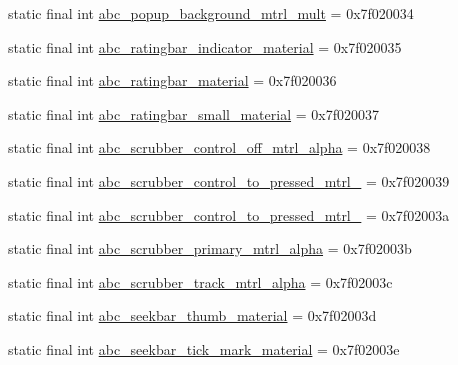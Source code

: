 \begin{CompactItemize}
\item 
static final int \hyperlink{classandroid_1_1support_1_1graphics_1_1drawable_1_1animated_1_1_r_1_1drawable_2c3cd96e28bd579a1da0616b4659d34b}{abc\_\-popup\_\-background\_\-mtrl\_\-mult} = 0x7f020034
\item 
static final int \hyperlink{classandroid_1_1support_1_1graphics_1_1drawable_1_1animated_1_1_r_1_1drawable_248b5dc39a5e104691fc50765a13eaaf}{abc\_\-ratingbar\_\-indicator\_\-material} = 0x7f020035
\item 
static final int \hyperlink{classandroid_1_1support_1_1graphics_1_1drawable_1_1animated_1_1_r_1_1drawable_f91c7618ee471fef665f4533f810ab14}{abc\_\-ratingbar\_\-material} = 0x7f020036
\item 
static final int \hyperlink{classandroid_1_1support_1_1graphics_1_1drawable_1_1animated_1_1_r_1_1drawable_27736b84265b3f0082805cd48000df2e}{abc\_\-ratingbar\_\-small\_\-material} = 0x7f020037
\item 
static final int \hyperlink{classandroid_1_1support_1_1graphics_1_1drawable_1_1animated_1_1_r_1_1drawable_eb5755bf4bac009580f94cde6cdf99a5}{abc\_\-scrubber\_\-control\_\-off\_\-mtrl\_\-alpha} = 0x7f020038
\item 
static final int \hyperlink{classandroid_1_1support_1_1graphics_1_1drawable_1_1animated_1_1_r_1_1drawable_e1e3c01f7d47b7215843c0754a430e17}{abc\_\-scrubber\_\-control\_\-to\_\-pressed\_\-mtrl\_} = 0x7f020039
\item 
static final int \hyperlink{classandroid_1_1support_1_1graphics_1_1drawable_1_1animated_1_1_r_1_1drawable_c7f8b37c50f9fbb46aa8b4f289c958ee}{abc\_\-scrubber\_\-control\_\-to\_\-pressed\_\-mtrl\_} = 0x7f02003a
\item 
static final int \hyperlink{classandroid_1_1support_1_1graphics_1_1drawable_1_1animated_1_1_r_1_1drawable_dc8fe9f5b693273a4b0a4a2721089d3d}{abc\_\-scrubber\_\-primary\_\-mtrl\_\-alpha} = 0x7f02003b
\item 
static final int \hyperlink{classandroid_1_1support_1_1graphics_1_1drawable_1_1animated_1_1_r_1_1drawable_e7916fc4938cefda9b9711771f03b3f0}{abc\_\-scrubber\_\-track\_\-mtrl\_\-alpha} = 0x7f02003c
\item 
static final int \hyperlink{classandroid_1_1support_1_1graphics_1_1drawable_1_1animated_1_1_r_1_1drawable_6b3fe70536dc96986da0ddc1cab7faa3}{abc\_\-seekbar\_\-thumb\_\-material} = 0x7f02003d
\item 
static final int \hyperlink{classandroid_1_1support_1_1graphics_1_1drawable_1_1animated_1_1_r_1_1drawable_f7faed6a774f3da28f1bfe6e5f071ade}{abc\_\-seekbar\_\-tick\_\-mark\_\-material} = 0x7f02003e

\end{CompactItemize}
